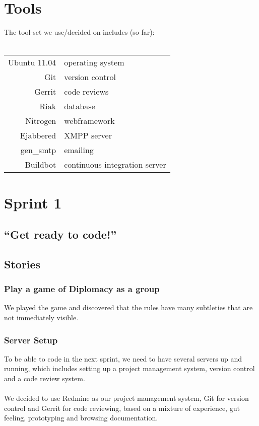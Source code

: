 \documentclass[11pt,a4paper]{article}
\begin{document}
\section{Tools}
The tool-set we use/decided on includes (so far): 
\\
\\
\label{tbl:tools}
\begin{tabular}{r|l}
Ubuntu 11.04 & operating system \\
Git & version control \\
Gerrit & code reviews \\
Riak & database \\
Nitrogen & webframework \\
Ejabbered & XMPP server \\
gen\_smtp & emailing \\
Buildbot & continuous integration server
\end{tabular}


\section{Sprint 1}

\subsection{``Get ready to code!''}

\subsection{Stories}
\subsubsection{Play a game of Diplomacy as a group}
We played the game and discovered that the rules have many subtleties that are not immediately visible.

\subsubsection{Server Setup}
To be able to code in the next sprint, we need to have several servers up and running,
 which includes setting up a project management system, version control and a code review system.
\\
\\
We decided to use Redmine as our project management system, Git for version control
and Gerrit for code reviewing, based on a mixture of experience, gut feeling,
prototyping and browsing documentation.
\end{document}

